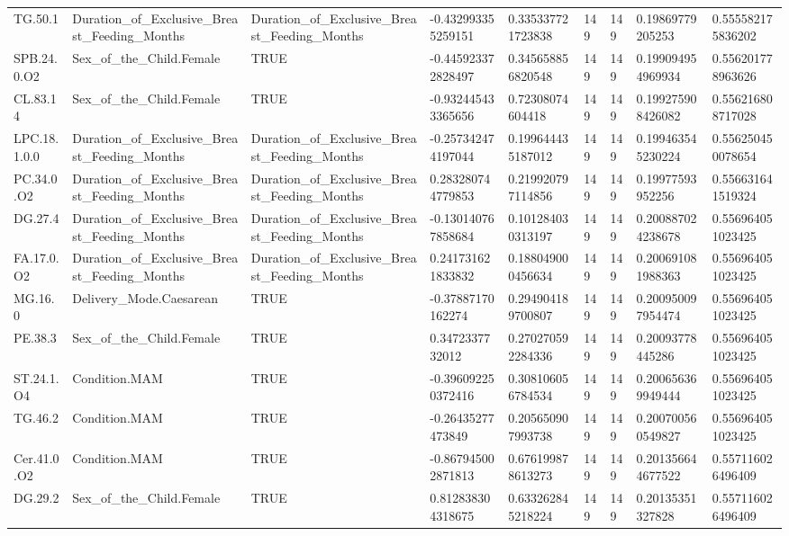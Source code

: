 \begin{longtable}{lllllllll}
TG.50.1 & Duration\_of\_Exclusive\_Breast\_Feeding\_Months & Duration\_of\_Exclusive\_Breast\_Feeding\_Months & -0.432993355259151 & 0.335337721723838 & 149 & 149 & 0.19869779205253 & 0.555582175836202 \\
SPB.24.0.O2 & Sex\_of\_the\_Child.Female & TRUE & -0.445923372828497 & 0.345658856820548 & 149 & 149 & 0.199094954969934 & 0.556201778963626 \\
CL.83.14 & Sex\_of\_the\_Child.Female & TRUE & -0.932445433365656 & 0.72308074604418 & 149 & 149 & 0.199275908426082 & 0.556216808717028 \\
LPC.18.1.0.0 & Duration\_of\_Exclusive\_Breast\_Feeding\_Months & Duration\_of\_Exclusive\_Breast\_Feeding\_Months & -0.257342474197044 & 0.199644435187012 & 149 & 149 & 0.199463545230224 & 0.556250450078654 \\
PC.34.0.O2 & Duration\_of\_Exclusive\_Breast\_Feeding\_Months & Duration\_of\_Exclusive\_Breast\_Feeding\_Months & 0.283280744779853 & 0.219920797114856 & 149 & 149 & 0.19977593952256 & 0.556631641519324 \\
DG.27.4 & Duration\_of\_Exclusive\_Breast\_Feeding\_Months & Duration\_of\_Exclusive\_Breast\_Feeding\_Months & -0.130140767858684 & 0.101284030313197 & 149 & 149 & 0.200887024238678 & 0.556964051023425 \\
FA.17.0.O2 & Duration\_of\_Exclusive\_Breast\_Feeding\_Months & Duration\_of\_Exclusive\_Breast\_Feeding\_Months & 0.241731621833832 & 0.188049000456634 & 149 & 149 & 0.200691081988363 & 0.556964051023425 \\
MG.16.0 & Delivery\_Mode.Caesarean & TRUE & -0.37887170162274 & 0.294904189700807 & 149 & 149 & 0.200950097954474 & 0.556964051023425 \\
PE.38.3 & Sex\_of\_the\_Child.Female & TRUE & 0.3472337732012 & 0.270270592284336 & 149 & 149 & 0.20093778445286 & 0.556964051023425 \\
ST.24.1.O4 & Condition.MAM & TRUE & -0.396092250372416 & 0.308106056784534 & 149 & 149 & 0.200656369949444 & 0.556964051023425 \\
TG.46.2 & Condition.MAM & TRUE & -0.26435277473849 & 0.205650907993738 & 149 & 149 & 0.200700560549827 & 0.556964051023425 \\
Cer.41.0.O2 & Condition.MAM & TRUE & -0.867945002871813 & 0.676199878613273 & 149 & 149 & 0.201356644677522 & 0.557116026496409 \\
DG.29.2 & Sex\_of\_the\_Child.Female & TRUE & 0.812838304318675 & 0.633262845218224 & 149 & 149 & 0.20135351327828 & 0.557116026496409 \\

\end{longtable}
